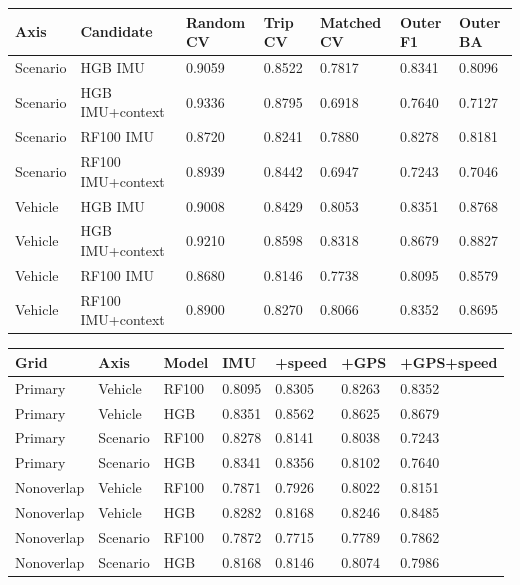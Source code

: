\par\medskip
\par\medskip
\begin{singlespace}\small
\noindent\begin{minipage}{\linewidth}
\centering
{}
\begin{tabularx}{\linewidth}{XYYYYYY}
\toprule
Axis & Candidate & Random CV & Trip CV & Matched CV & Outer F1 & Outer BA \\
\midrule
Scenario & HGB IMU & 0.9059 & 0.8522 & 0.7817 & 0.8341 & 0.8096 \\
Scenario & HGB IMU+context & 0.9336 & 0.8795 & 0.6918 & 0.7640 & 0.7127 \\
Scenario & RF100 IMU & 0.8720 & 0.8241 & 0.7880 & 0.8278 & 0.8181 \\
Scenario & RF100 IMU+context & 0.8939 & 0.8442 & 0.6947 & 0.7243 & 0.7046 \\
Vehicle & HGB IMU & 0.9008 & 0.8429 & 0.8053 & 0.8351 & 0.8768 \\
Vehicle & HGB IMU+context & 0.9210 & 0.8598 & 0.8318 & 0.8679 & 0.8827 \\
Vehicle & RF100 IMU & 0.8680 & 0.8146 & 0.7738 & 0.8095 & 0.8579 \\
Vehicle & RF100 IMU+context & 0.8900 & 0.8270 & 0.8066 & 0.8352 & 0.8695 \\
\bottomrule
\end{tabularx}
\end{minipage}
\end{singlespace}
\par\medskip
\par\medskip
\begin{singlespace}\small
\noindent\begin{minipage}{\linewidth}
\centering
{}
\begin{tabularx}{\linewidth}{XYYYYYY}
\toprule
Grid & Axis & Model & IMU & +speed & +GPS & +GPS+speed \\
\midrule
Primary & Vehicle & RF100 & 0.8095 & 0.8305 & 0.8263 & 0.8352 \\
Primary & Vehicle & HGB & 0.8351 & 0.8562 & 0.8625 & 0.8679 \\
Primary & Scenario & RF100 & 0.8278 & 0.8141 & 0.8038 & 0.7243 \\
Primary & Scenario & HGB & 0.8341 & 0.8356 & 0.8102 & 0.7640 \\
Nonoverlap & Vehicle & RF100 & 0.7871 & 0.7926 & 0.8022 & 0.8151 \\
Nonoverlap & Vehicle & HGB & 0.8282 & 0.8168 & 0.8246 & 0.8485 \\
Nonoverlap & Scenario & RF100 & 0.7872 & 0.7715 & 0.7789 & 0.7862 \\
Nonoverlap & Scenario & HGB & 0.8168 & 0.8146 & 0.8074 & 0.7986 \\
\bottomrule
\end{tabularx}
\end{minipage}
\end{singlespace}
\par\medskip

